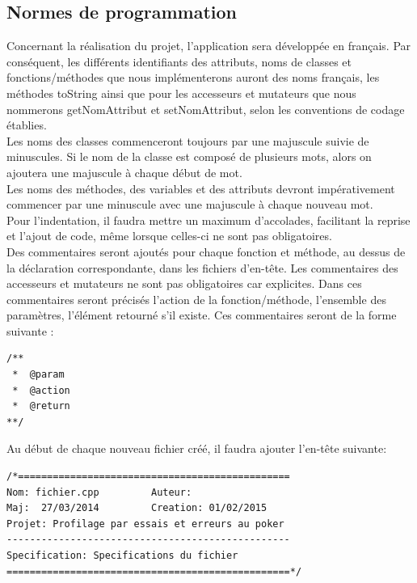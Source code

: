 \documentclass{report}
\begin{document}
\subsection{Normes de programmation}
\hspace{0.5cm}Concernant la réalisation du projet, l'application sera développée en français. Par conséquent, les différents identifiants des attributs, noms de classes et fonctions/méthodes que nous implémenterons auront des noms français, les méthodes toString ainsi que pour les accesseurs et mutateurs que nous nommerons getNomAttribut et setNomAttribut, selon les conventions de codage établies.\\

Les noms des classes commenceront toujours par une majuscule suivie de minuscules. Si le nom de la classe est composé de plusieurs mots, alors on ajoutera une majuscule à chaque début de mot.\\

Les noms des méthodes, des variables et des attributs devront impérativement commencer par une minuscule avec une majuscule à chaque nouveau mot.\\

Pour l'indentation, il faudra mettre un maximum d'accolades, facilitant la reprise et l'ajout de code, même lorsque celles-ci ne sont pas obligatoires.\\

Des commentaires seront ajoutés pour chaque fonction et méthode, au dessus de la déclaration correspondante, dans les fichiers d'en-tête. Les commentaires des accesseurs et mutateurs ne sont pas obligatoires car explicites.
Dans ces commentaires seront précisés l'action de la fonction/méthode, l'ensemble des paramètres, l'élément retourné s'il existe. Ces commentaires seront de la forme suivante : \par

\begin{lstlisting}
/**
 *  @param
 *  @action
 *  @return
**/
\end{lstlisting}

\newpage

Au début de chaque nouveau fichier créé, il faudra ajouter l'en-tête suivante: 
\begin{lstlisting}
/*===============================================
Nom: fichier.cpp         Auteur: 
Maj:  27/03/2014         Creation: 01/02/2015
Projet: Profilage par essais et erreurs au poker
-------------------------------------------------
Specification: Specifications du fichier
=================================================*/
\end{lstlisting}
\end{document}
